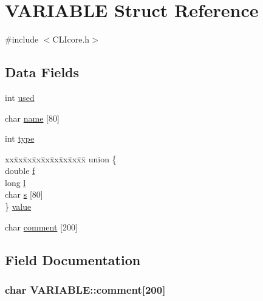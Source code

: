 \hypertarget{structVARIABLE}{}\section{V\+A\+R\+I\+A\+B\+L\+E Struct Reference}
\label{structVARIABLE}


{\ttfamily \#include $<$C\+L\+Icore.\+h$>$}

\subsection*{Data Fields}
\begin{DoxyCompactItemize}
\item 
int \hyperlink{structVARIABLE_a33fcb1d4034cdf238453dc4ac3f17290}{used}
\item 
char \hyperlink{structVARIABLE_a40d583ae511f61e22f3ade6f130a7d58}{name} \mbox{[}80\mbox{]}
\item 
int \hyperlink{structVARIABLE_a84814331e54156c3ac9fbe6d2b851daf}{type}
\item 
\begin{tabbing}
xx\=xx\=xx\=xx\=xx\=xx\=xx\=xx\=xx\=\kill
union \{\\
\>double \hyperlink{structVARIABLE_af31bb248155770bb6d7080aa50bdb4fd}{f}\\
\>long \hyperlink{structVARIABLE_ab47a102e3cd7c7085641ffc056c41878}{l}\\
\>char \hyperlink{structVARIABLE_a63e49f4cf699d62212a55d257d0d87f7}{s} \mbox{[}80\mbox{]}\\
\} \hyperlink{structVARIABLE_ac78c074d5d0c437357a205d97ee58c70}{value}\\

\end{tabbing}\item 
char \hyperlink{structVARIABLE_a681a0cb52e89855a9cf7f1bd908ba6ee}{comment} \mbox{[}200\mbox{]}
\end{DoxyCompactItemize}


\subsection{Field Documentation}
\hypertarget{structVARIABLE_a681a0cb52e89855a9cf7f1bd908ba6ee}{}
\subsubsection[{comment}]{\setlength{\rightskip}{0pt plus 5cm}char V\+A\+R\+I\+A\+B\+L\+E\+::comment\mbox{[}200\mbox{]}}\label{structVARIABLE_a681a0cb52e89855a9cf7f1bd908ba6ee}
\hypertarget{structVARIABLE_af31bb248155770bb6d7080aa50bdb4fd}{}
